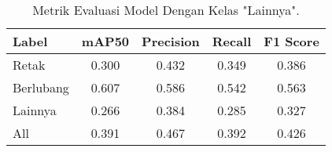 \documentclass[12pt,a4paper]{article}
\begin{document}
\begin{table}[ht]
\centering
\begin{tabularx}{0.7\textwidth}{lCCCC}
    \toprule
    \textbf{Label} & \textbf{mAP50} & \textbf{Precision} & \textbf{Recall} & \textbf{F1 Score} \\
    \midrule
    Retak & 0.300 & 0.432 & 0.349 & 0.386 \\
    Berlubang & 0.607 & 0.586 & 0.542 & 0.563 \\
    Lainnya & 0.266 & 0.384 & 0.285 & 0.327 \\
    All & 0.391 & 0.467 & 0.392 & 0.426 \\
    \bottomrule
\end{tabularx}
\caption{Metrik Evaluasi Model Dengan Kelas "Lainnya".}
\label{tab:with_others}
\end{table}
\end{document}
